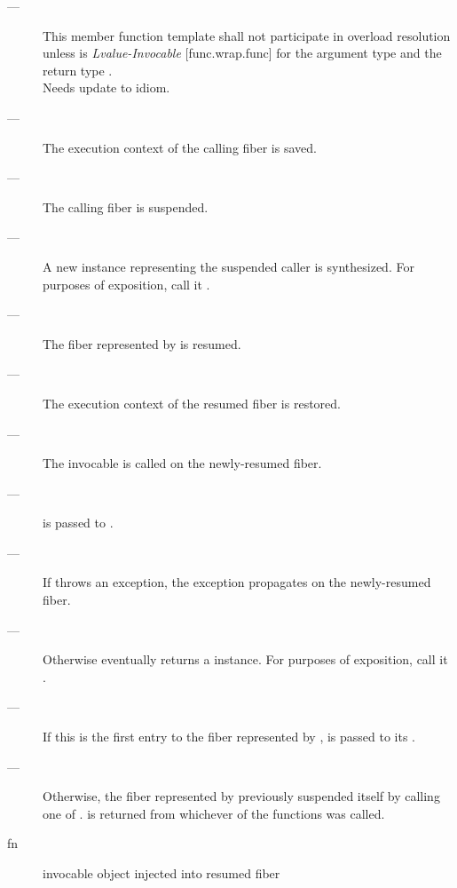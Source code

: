 \effects
\begin{description}
    \item[---] This member function template shall not participate in overload
               resolution unless  is \emph{Lvalue-Invocable} [func.wrap.func]
               for the argument type  and the return
               type \fiber.\\
                Needs update to  idiom.
    \item[---] The execution context of the calling fiber is saved.
    \item[---] The calling fiber is suspended.
    \item[---] A new \fiber instance representing the suspended caller is
               synthesized. For purposes of exposition, call it .
    \item[---] The fiber represented by  is resumed.
    \item[---] The execution context of the resumed fiber is restored.
    \item[---] The invocable  is called on the newly-resumed fiber.
    \item[---]  is passed to .
    \item[---] If  throws an exception, the exception propagates on
               the newly-resumed fiber.
    \item[---] Otherwise  eventually returns a \fiber instance. For
               purposes of exposition, call it .
    \item[---] If this is the first entry to the fiber represented
               by ,  is passed to its \entryfn.
    \item[---] Otherwise, the fiber represented by  previously
               suspended itself by calling one of \allresume. 
               is returned from whichever of the  functions was
               called.
\end{description}

\params
\begin{description}
    \item[fn] invocable object injected into resumed fiber
\end{description}

